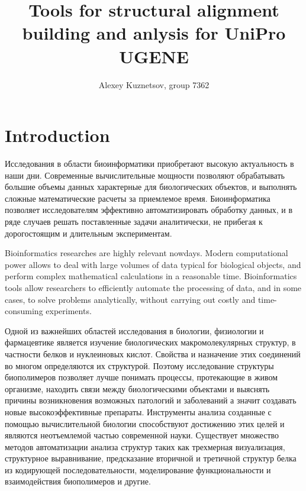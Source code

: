 \documentclass[a4paper, 12pt, titlepage, utf8]{extarticle}
\author{Alexey Kuznetsov, group 7362}
\title{Tools for structural alignment building and anlysis for UniPro UGENE}
\let\oldsection\section         %
\renewcommand{\section}{\newpage\oldsection}
\begin{document}


\tableofcontents
\newpage

\section{Introduction}      %
\begin{original}
Исследования в области биоинформатики приобретают высокую актуальность в наши
дни.
Современные вычислительные мощности позволяют обрабатывать большие объемы данных
характерные для биологических объектов, и выполнять сложные математические
расчеты за приемлемое время. Биоинформатика позволяет исследователям эффективно
автоматизировать обработку данных, и в ряде случаев решать поставленные задачи
аналитически, не прибегая к дорогостоящим и длительным экспериментам.
\end{original}

Bioinformatics researches are highly relevant nowdays.
Modern computational power allows to deal with large volumes of data typical for
biological objects, and perform complex mathematical calculations in a
reasonable time. Bioinformatics tools allow researchers to efficiently automate
the processing of data, and in some cases, to solve problems analytically,
without carrying out costly and time-consuming experiments.

\begin{original}
Одной из важнейших областей исследования в биологии, физиологии и фармацевтике
является изучение биологических макромолекулярных структур, в частности белков и
нуклеиновых кислот. Свойства и назначение этих соединений во многом определяются
их структурой. Поэтому исследование структуры биополимеров позволяет лучше
понимать процессы, протекающие в живом организме, находить связи между
биологическими объектами и выяснять причины возникновения возможных патологий и
заболеваний а значит создавать новые высокоэффективные препараты. Инструменты
анализа созданные с помощью вычислительной биологии способствуют достижению этих
целей и являются неотъемлемой частью современной науки. Существует множество
методов автоматизации анализа структур таких как трехмерная визуализация,
структурное выравнивание, предсказание вторичной и третичной структур белка из
кодирующей последовательности, моделирование функциональности и взаимодействия
биополимеров и другие.
\end{original}
\end{document}
